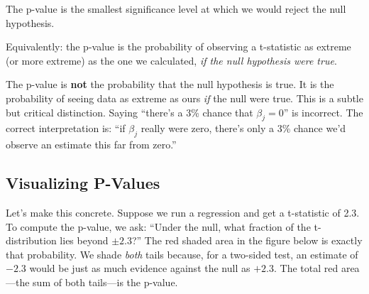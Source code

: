 \documentclass[
  letterpaper,
  DIV=11,
  numbers=noendperiod]{scrreprt}
\begin{document}
\begin{tcolorbox}[enhanced jigsaw, arc=.35mm, bottomrule=.15mm, bottomtitle=1mm, breakable, colback=white, colbacktitle=quarto-callout-important-color!10!white, colframe=quarto-callout-important-color-frame, coltitle=black, left=2mm, leftrule=.75mm, opacityback=0, opacitybacktitle=0.6, rightrule=.15mm, title=\textcolor{quarto-callout-important-color}{\faExclamation}\hspace{0.5em}{Definition: P-Value}, titlerule=0mm, toprule=.15mm, toptitle=1mm]

The p-value is the smallest significance level at which we would reject
the null hypothesis.

Equivalently: the p-value is the probability of observing a t-statistic
as extreme (or more extreme) as the one we calculated, \emph{if the null
hypothesis were true}.

\end{tcolorbox}

\begin{tcolorbox}[enhanced jigsaw, arc=.35mm, bottomrule=.15mm, bottomtitle=1mm, breakable, colback=white, colbacktitle=quarto-callout-warning-color!10!white, colframe=quarto-callout-warning-color-frame, coltitle=black, left=2mm, leftrule=.75mm, opacityback=0, opacitybacktitle=0.6, rightrule=.15mm, title=\textcolor{quarto-callout-warning-color}{\faExclamationTriangle}\hspace{0.5em}{Common Misconception}, titlerule=0mm, toprule=.15mm, toptitle=1mm]

The p-value is \textbf{not} the probability that the null hypothesis is
true. It is the probability of seeing data as extreme as ours \emph{if}
the null were true. This is a subtle but critical distinction. Saying
``there's a 3\% chance that \(\beta_j = 0\)'' is incorrect. The correct
interpretation is: ``if \(\beta_j\) really were zero, there's only a 3\%
chance we'd observe an estimate this far from zero.''

\end{tcolorbox}

\subsection{Visualizing P-Values}\label{visualizing-p-values}

Let's make this concrete. Suppose we run a regression and get a
t-statistic of 2.3. To compute the p-value, we ask: ``Under the null,
what fraction of the t-distribution lies beyond \(\pm 2.3\)?'' The red
shaded area in the figure below is exactly that probability. We shade
\emph{both} tails because, for a two-sided test, an estimate of \(-2.3\)
would be just as much evidence against the null as \(+2.3\). The total
red area---the sum of both tails---is the p-value.
\end{document}
